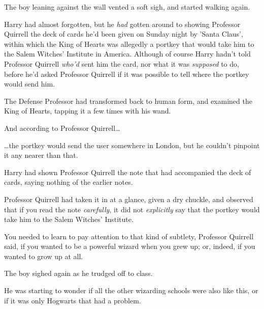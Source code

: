 The boy leaning against the wall vented a soft sigh, and started walking again.

Harry had almost forgotten, but he \emph{had} gotten around to showing 
Professor Quirrell the deck of cards he'd been given on Sunday night by 'Santa 
Claus', within which the King of Hearts was allegedly a portkey that would take 
him to the Salem Witches' Institute in America. Although of course Harry hadn't 
told Professor Quirrell \emph{who'd} sent him the card, nor what it was 
\emph{supposed} to do, before he'd asked Professor Quirrell if it was possible 
to tell where the portkey would send him.

The Defense Professor had transformed back to human form, and examined the King 
of Hearts, tapping it a few times with his wand.

And according to Professor Quirrell{\ldots}

{\ldots}the portkey would send the user somewhere in London, but he couldn't 
pinpoint it any nearer than that.

Harry had shown Professor Quirrell the note that had accompanied the deck of 
cards, saying nothing of the earlier notes.

Professor Quirrell had taken it in at a glance, given a dry chuckle, and 
observed that if you read the note \emph{carefully}, it did not 
\emph{explicitly} say that the portkey would take him to the Salem Witches' 
Institute.

You needed to learn to pay attention to that kind of subtlety, Professor 
Quirrell said, if you wanted to be a powerful wizard when you grew up; or, 
indeed, if you wanted to grow up at all.

The boy sighed again as he trudged off to class.

He was starting to wonder if all the other wizarding schools were also like 
this, or if it was only Hogwarts that had a problem.

